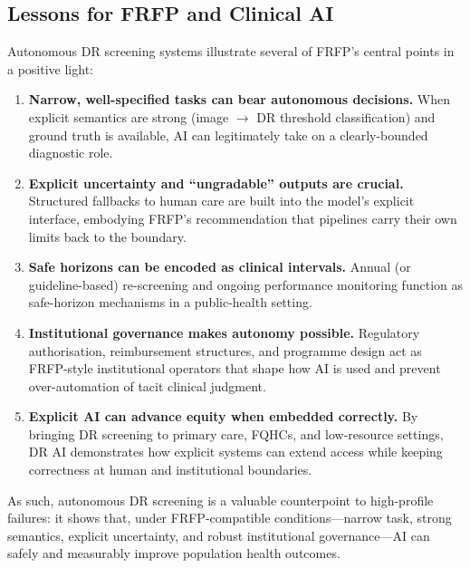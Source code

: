 \subsection{Lessons for FRFP and Clinical AI}

Autonomous DR screening systems illustrate several of FRFP’s central points
in a positive light:

\begin{enumerate}
  \item \textbf{Narrow, well-specified tasks can bear autonomous decisions.}
        When explicit semantics are strong (image $\to$ DR threshold
        classification) and ground truth is available, AI can legitimately
        take on a clearly-bounded diagnostic role.

  \item \textbf{Explicit uncertainty and ``ungradable'' outputs are crucial.}
        Structured fallbacks to human care are built into the model’s
        explicit interface, embodying FRFP’s recommendation that pipelines
        carry their own limits back to the boundary.

  \item \textbf{Safe horizons can be encoded as clinical intervals.}
        Annual (or guideline-based) re-screening and ongoing performance
        monitoring function as safe-horizon mechanisms in a public-health
        setting.

  \item \textbf{Institutional governance makes autonomy possible.}
        Regulatory authorisation, reimbursement structures, and programme
        design act as FRFP-style institutional operators that shape how AI
        is used and prevent over-automation of tacit clinical judgment.

  \item \textbf{Explicit AI can advance equity when embedded correctly.}
        By bringing DR screening to primary care, FQHCs, and low-resource
        settings, DR AI demonstrates how explicit systems can extend access
        while keeping correctness at human and institutional boundaries.
\end{enumerate}

As such, autonomous DR screening is a valuable counterpoint to high-profile
failures:
it shows that, under FRFP-compatible conditions---narrow task, strong
semantics, explicit uncertainty, and robust institutional governance---AI
can safely and measurably improve population health outcomes.
